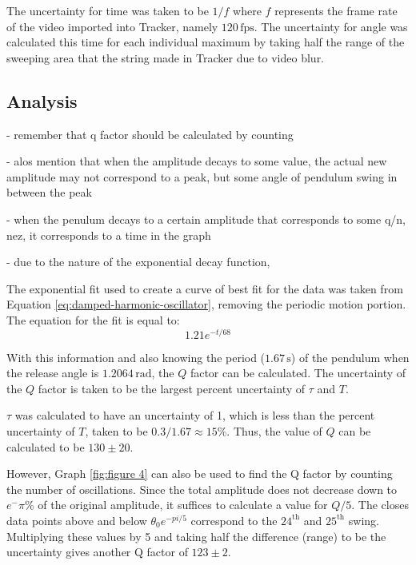 \documentclass[12pt]{article}
\begin{document}
The uncertainty for time was taken to be $1/f$ where $f$ represents the frame rate of the video imported into Tracker, namely $120\,\text{fps}$. The uncertainty for angle was calculated this time for each individual maximum by taking half the range of the sweeping area that the string made in Tracker due to video blur.


\subsection{Analysis}

{\color{blue}

- remember that q factor should be calculated by counting

- alos mention that when the amplitude decays to some value, the actual new amplitude may not correspond to a peak, but some angle of pendulum swing in between the peak


- when the penulum decays to a certain amplitude that corresponds to some q/n, nez, it corresponds to a time in the graph

- due to the nature of the exponential decay function,

}


The exponential fit used to create a curve of best fit for the data was taken from Equation \ref{eq:damped-harmonic-oscillator}, removing the periodic motion portion. The equation for the fit is equal to:
\begin{equation}
    1.21e^{-{t}/68}
\end{equation}

With this information and also knowing the period ($1.67\,\text{s}$) of the pendulum when the release angle is $1.2064\,\text{rad}$, the $Q$ factor can be calculated. The uncertainty of the $Q$ factor is taken to be the largest percent uncertainty of $\tau$ and $T$.

$\tau$ was calculated to have an uncertainty of 1, which is less than the percent uncertainty of $T$, taken to be $0.3/1.67 \approx 15\%$. Thus, the value of $Q$ can be calculated to be $130 \pm 20$.

However, Graph \ref{fig:figure 4} can also be used to find the Q factor by counting the number of oscillations. Since the total amplitude does not decrease down to $e^-\pi \%$ of the original amplitude, it suffices to calculate a value for $Q/5$. The closes data points above and below $\theta_0e^{-{pi/5}}$ correspond to the $24^\text{th}$ and $25^\text{th}$ swing. Multiplying these values by 5 and taking half the difference (range) to be the uncertainty gives another Q factor of $123 \pm 2$.
\end{document}
